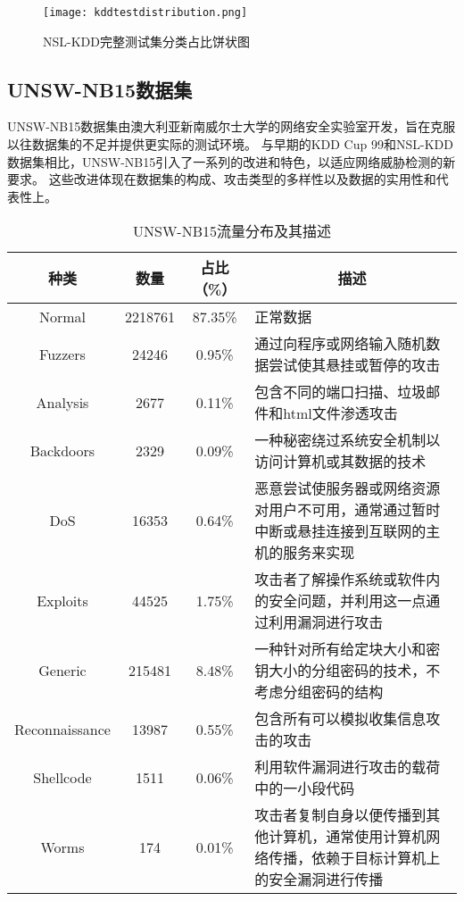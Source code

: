   \begin{figure}[htbp]
    \centering
    \texttt{[image: kddtestdistribution.png]}
    \caption{NSL-KDD完整测试集分类占比饼状图}
    \label{fig:kddtestdistribution}
  \end{figure}

\subsection{UNSW-NB15数据集\cite{moustafa2015comprehensive}}
UNSW-NB15数据集由澳大利亚新南威尔士大学的网络安全实验室开发，旨在克服以往数据集的不足并提供更实际的测试环境。
与早期的KDD Cup 99和NSL-KDD数据集相比，UNSW-NB15引入了一系列的改进和特色，以适应网络威胁检测的新要求。
这些改进体现在数据集的构成、攻击类型的多样性以及数据的实用性和代表性上。

\begin{table}[htbp]
  \caption{UNSW-NB15流量分布及其描述}
  \label{tab:UNSW-NB15_distribution}
  \begin{tabularx}{\textwidth}{@{}cccX@{}}
    \toprule
      \multicolumn{1}{c}{\textbf{种类}} & \multicolumn{1}{c}{\textbf{数量}} & \multicolumn{1}{c}{\textbf{占比（\%）}} & \multicolumn{1}{c}{\textbf{描述}}\\
    \midrule
  Normal & 2218761 & 87.35\% & 正常数据 \\

  Fuzzers & 24246 & 0.95\% & 通过向程序或网络输入随机数据尝试使其悬挂或暂停的攻击 \\

  Analysis & 2677 & 0.11\% & 包含不同的端口扫描、垃圾邮件和html文件渗透攻击 \\

  Backdoors & 2329 & 0.09\% & 一种秘密绕过系统安全机制以访问计算机或其数据的技术 \\

  DoS & 16353 & 0.64\% & 恶意尝试使服务器或网络资源对用户不可用，通常通过暂时中断或悬挂连接到互联网的主机的服务来实现 \\

  Exploits & 44525 & 1.75\% & 攻击者了解操作系统或软件内的安全问题，并利用这一点通过利用漏洞进行攻击 \\

  Generic & 215481 & 8.48\% & 一种针对所有给定块大小和密钥大小的分组密码的技术，不考虑分组密码的结构 \\

  Reconnaissance & 13987 & 0.55\% & 包含所有可以模拟收集信息攻击的攻击 \\

  Shellcode & 1511 & 0.06\% & 利用软件漏洞进行攻击的载荷中的一小段代码 \\

  Worms & 174 & 0.01\% & 攻击者复制自身以便传播到其他计算机，通常使用计算机网络传播，依赖于目标计算机上的安全漏洞进行传播 \\
  \bottomrule
  \end{tabularx}
  \end{table}


